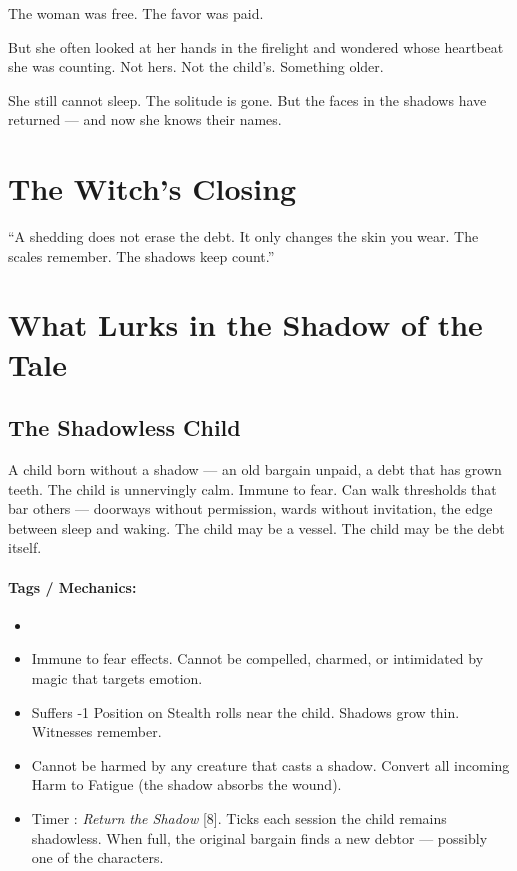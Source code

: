 The woman was free. The favor was paid.

But she often looked at her hands in the firelight and wondered whose heartbeat she was counting. Not hers. Not the child's. Something older.

She still cannot sleep. The solitude is gone. But the faces in the shadows have returned --- and now she knows their names.

\section*{The Witch's Closing}
``A shedding does not erase the debt. It only changes the skin you wear. The scales remember. The shadows keep count.''

\section*{What Lurks in the Shadow of the Tale}

\subsection*{The Shadowless Child}

A child born without a shadow --- an old bargain unpaid, a debt that has grown teeth. The child is unnervingly calm. Immune to fear. Can walk thresholds that bar others --- doorways without permission, wards without invitation, the edge between sleep and waking. The child may be a vessel. The child may be the debt itself.

\paragraph{Tags / Mechanics:}
\begin{itemize}
\item [THRESHOLD] [DREAD] [MARK]
\item Immune to fear effects. Cannot be compelled, charmed, or intimidated by magic that targets emotion.
\item Suffers -1 Position on Stealth rolls near the child. Shadows grow thin. Witnesses remember.
\item Cannot be harmed by any creature that casts a shadow. Convert all incoming Harm to Fatigue (the shadow absorbs the wound).
\item Timer : \textit{Return the Shadow} [8]. Ticks each session the child remains shadowless. When full, the original bargain finds a new debtor --- possibly one of the characters.
\end{itemize}


